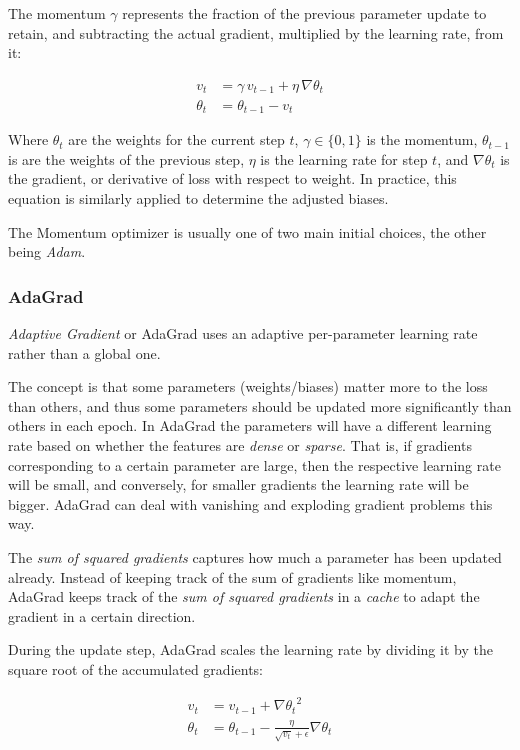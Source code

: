 \documentclass[a4paper]{article}
\begin{document}
The momentum $\gamma$ represents the fraction of the previous parameter update to retain, and subtracting the actual gradient, multiplied by the learning rate, from it:

\begin{align*}
    v_t &= \gamma \, v_{t-1} + \eta \, \nabla\theta_t \\
    \theta_t &= \theta_{t-1} - v_t
\end{align*}

Where $\theta_t$ are the weights for the current step $t$, $\gamma \in \{0,1\}$ is the momentum, $\theta_{t-1}$ is are the weights of the previous step, $\eta$ is the learning rate for step $t$, and $\nabla\theta_t$ is the gradient, or derivative of loss with respect to weight. In practice, this equation is similarly applied to determine the adjusted biases.

The Momentum optimizer is usually one of two main initial choices, the other being \emph{Adam}. 

\subsubsection*{AdaGrad}
\emph{Adaptive Gradient} or AdaGrad uses an adaptive per-parameter learning rate rather than a global one. 

The concept is that some parameters (weights/biases) matter more to the loss than others, and thus some parameters should be updated more significantly than others in each epoch. In AdaGrad the parameters will have a different learning rate based on whether the features are \emph{dense} or \emph{sparse}. That is, if gradients corresponding to a certain parameter are large, then the respective learning rate will be small, and conversely, for smaller gradients the learning rate will be bigger. AdaGrad can deal with vanishing and exploding gradient problems this way.

The \emph{sum of squared gradients} captures how much a parameter has been updated already. Instead of keeping track of the sum of gradients like momentum, AdaGrad keeps track of the \emph{sum of squared gradients} in a \emph{cache} to adapt the gradient in a certain direction.

During the update step, AdaGrad scales the learning rate by dividing it by the square root of the accumulated gradients:

\begin{align*}
    v_t &= v_{t-1} + {\nabla\theta_t}^2 \\
    \theta_t &= \theta_{t-1} - \frac{\eta}{\sqrt{v_t} + \epsilon} \nabla\theta_t
\end{align*}
\end{document}
